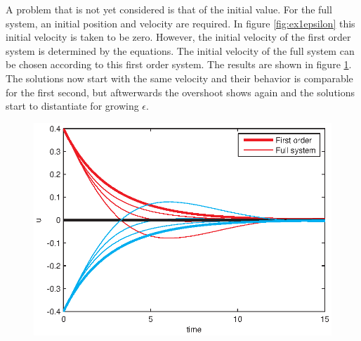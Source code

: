 A problem that is not yet considered is that of the initial value. For the full system, an initial position and velocity are required. In figure \ref{fig:ex1epsilon} this initial velocity is taken to be zero. However, the initial velocity of the first order system is determined by the equations. The initial velocity of the full system can be chosen according to this first order system. The results are shown in figure \ref{fig:epsilon2}. The solutions now start with the same velocity and their behavior is comparable for the first second, but aftwerwards the overshoot shows again and the solutions start to distantiate for growing $\epsilon$.
\begin{figure}[H]
\centering
\includegraphics{img/ex1/epsilon2.eps}
\caption{}
\label{fig:epsilon2}
\end{figure}


